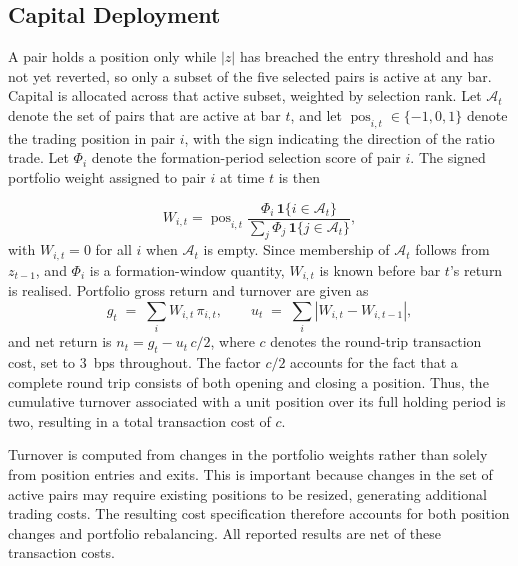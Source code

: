 \documentclass[11pt,a4paper]{article}
\theoremstyle{definition}
\begin{document}
\subsection{Capital Deployment}

A pair holds a position only while $|z|$ has breached the entry threshold and
has not yet reverted, so only a subset of the five selected pairs is active at
any bar. Capital is allocated across that active subset, weighted by selection
rank. Let $\mathcal{A}_t$ denote the set of pairs that are active at bar $t$, and let
$\operatorname{pos}_{i,t}\in\{-1,0,1\}$ denote the trading position in pair $i$,
with the sign indicating the direction of the ratio trade. Let $\Phi_i$ denote
the formation-period selection score of pair $i$. The signed portfolio weight
assigned to pair $i$ at time $t$ is then

\begin{equation}
W_{i,t}
=
\operatorname{pos}_{i,t}
\frac{\Phi_i\,\mathbf{1}\{i\in\mathcal{A}_t\}}
{\sum_j \Phi_j\,\mathbf{1}\{j\in\mathcal{A}_t\}},
\label{eq:weights}
\end{equation}
with $W_{i,t} = 0$ for all $i$ when $\mathcal{A}_t$ is empty. Since membership of
$\mathcal{A}_t$ follows from $z_{t-1}$, and $\Phi_i$ is a formation-window
quantity, $W_{i,t}$ is known before bar $t$'s return is realised. Portfolio gross
return and turnover are given as
\begin{equation}
  g_t \;=\; \sum_i W_{i,t}\,\pi_{i,t},
  \qquad
  u_t \;=\; \sum_i \left|W_{i,t} - W_{i,t-1}\right|,
  \label{eq:pgross}
\end{equation}
and net return is $n_t = g_t - u_t\,c/2$, where $c$ denotes the round-trip transaction cost, set to
$3$~bps throughout. The factor $c/2$ accounts for the fact that a complete round trip consists of both opening and closing a position. Thus, the cumulative turnover associated with a unit position over its full holding period is two, resulting in a total transaction cost of $c$.

Turnover is computed from changes in the portfolio weights rather than solely from position entries and exits. This is important because changes in the set of active pairs may require existing positions to be resized, generating additional trading costs. The resulting cost specification therefore accounts for both position changes and portfolio rebalancing. All reported results are net of these transaction costs.

\end{document}
